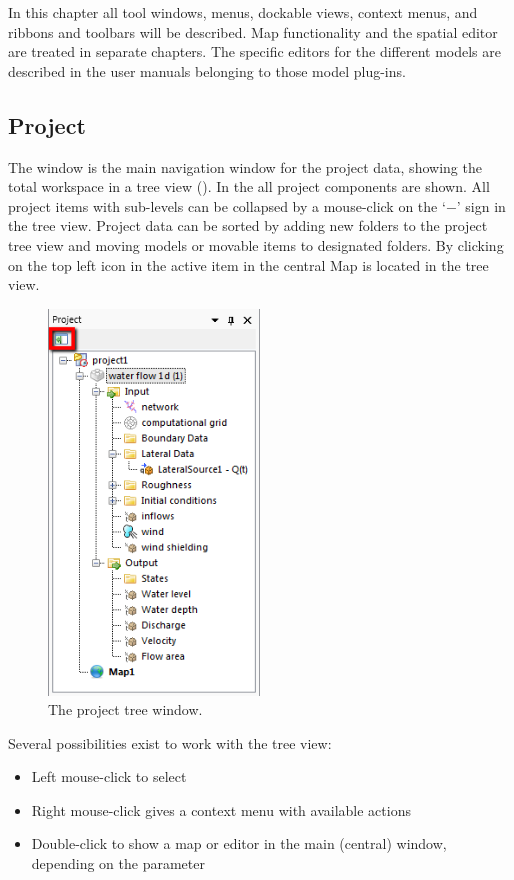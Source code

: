 %
In this chapter all tool windows, menus, dockable views, context menus, and ribbons and toolbars will be described. Map functionality and the spatial editor are treated in separate chapters. The specific editors for the different models are described in the user manuals belonging to those model plug-ins.

\subsection{Project}
\label{subsec:project}
The  window is the main navigation window for the project data, showing the total workspace in a tree view (). In the  all project components are shown. 
%
All project items with sub-levels can be collapsed by a mouse-click on the `$-$' sign in the tree view. Project data can be sorted by adding new folders to the project tree view and moving models or movable items to designated folders.
%
By clicking on the top left icon in  the active item in the central Map is located in the tree view.
%
\begin{figure} [H]
	\centering
		\includegraphics[width=0.5\textwidth]{figures/chapter_overview/view_project_window.png}
	\caption{The project tree window.}
	\label{fig:figoverview.2}
\end{figure}
%
Several possibilities exist to work with the tree view:
%
\begin{itemize}
	\item Left mouse-click to select
	\item Right mouse-click gives a context menu with available actions
	\item Double-click to show a map or editor in the main (central) window, depending on the parameter
\end{itemize}
%
